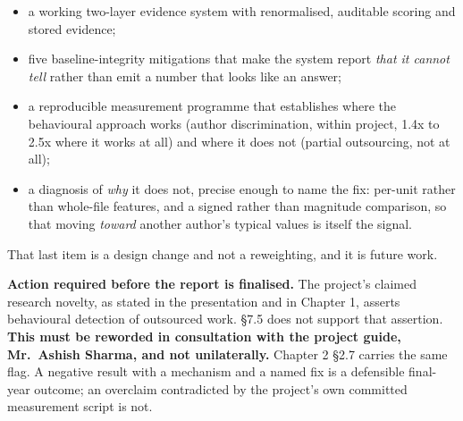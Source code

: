\begin{itemize}
\tightlist
\item
  a working two-layer evidence system with renormalised, auditable
  scoring and stored evidence;
\item
  five baseline-integrity mitigations that make the system report
  \emph{that it cannot tell} rather than emit a number that looks like
  an answer;
\item
  a reproducible measurement programme that establishes where the
  behavioural approach works (author discrimination, within project,
  1.4x to 2.5x where it works at all) and where it does not (partial
  outsourcing, not at all);
\item
  a diagnosis of \emph{why} it does not, precise enough to name the fix:
  per-unit rather than whole-file features, and a signed rather than
  magnitude comparison, so that moving \emph{toward} another author's
  typical values is itself the signal.
\end{itemize}

That last item is a design change and not a reweighting, and it is
future work.

\begin{draftnote}

\textbf{Action required before the report is finalised.} The project's
claimed research novelty, as stated in the presentation and in Chapter
1, asserts behavioural detection of outsourced work. \S{}7.5 does not
support that assertion. \textbf{This must be reworded in consultation
with the project guide, Mr.~Ashish Sharma, and not unilaterally.}
Chapter 2 \S{}2.7 carries the same flag. A negative result with a mechanism
and a named fix is a defensible final-year outcome; an overclaim
contradicted by the project's own committed measurement script is not.

\end{draftnote}
